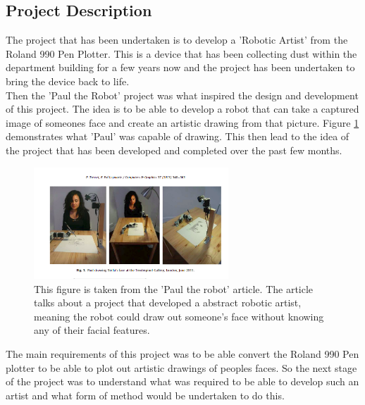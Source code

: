 \documentclass{article}
\begin{document}
    \subsection{Project Description}
    
The project that has been undertaken is to develop a 'Robotic Artist' from the Roland 990 Pen Plotter. This is a device that has been collecting dust within the department building for a few years now and the project has been undertaken to bring the device back to life.\\ \newline
Then the 'Paul the Robot' project\cite{Paul_the_robot} was what inspired the design and development of this project. The idea is to be able to develop a robot that can take a captured image of someones face and create an artistic drawing from that picture. Figure \ref{fig:paul_the_robot} demonstrates what 'Paul' was capable of drawing. This then lead to the idea of the project that has been developed and completed over the past few months. \\ \newline

\begin{figure}[h]
    \centering
    \includegraphics[width=0.65\textwidth]{Paul_the_robot.png}
    \caption{This figure is taken from the 'Paul the robot' article\cite{Paul_the_robot}. The article talks about a project that developed a abstract robotic artist, meaning the robot could draw out someone's face without knowing any of their facial features.}
    \label{fig:paul_the_robot}
\end{figure}

The main requirements of this project was to be able convert the Roland 990 Pen plotter to be able to plot out artistic drawings of peoples faces. So the next stage of the project was to understand what was required to be able to develop such an artist and what form of method would be undertaken to do this.\\ \newline
\end{document}
